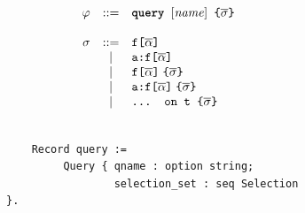 \begin{figure}[h]
  \centering
  \begin{subfigure}{.5\textwidth}
  \begin{displaymath}
	\begin{array}{rcl}
	\varphi & ::= & \textbf{\texttt{query }} [\mathit{name}] \texttt{ \{}  \overline{\sigma} \texttt{\}} \\
	&& \\
	\sigma & ::= & \texttt{f[}\overline{\alpha}\texttt{]} \\
	& | & \texttt{a:}\texttt{f[}\overline{\alpha}\texttt{]} \\		
	& | & \texttt{f[}\overline{\alpha}\texttt{]}\; \texttt{\{}\overline{\sigma}\texttt{\}} \\
	& | & \texttt{a:}\texttt{f[}\overline{\alpha}\texttt{]}\; \texttt{\{}\overline{\sigma}\texttt{\}} \\
	& | & \texttt{... on t \{}\overline{\sigma}\texttt{\}} \\
	\end{array}
	\end{displaymath}
	

    
  \end{subfigure}%
  \begin{subfigure}{.5\textwidth}

    \begin{verbatim}
    
    Record query := 
         Query { qname : option string; 
                 selection_set : seq Selection }.
                   

\end{verbatim}
\end{subfigure}
\end{figure}
